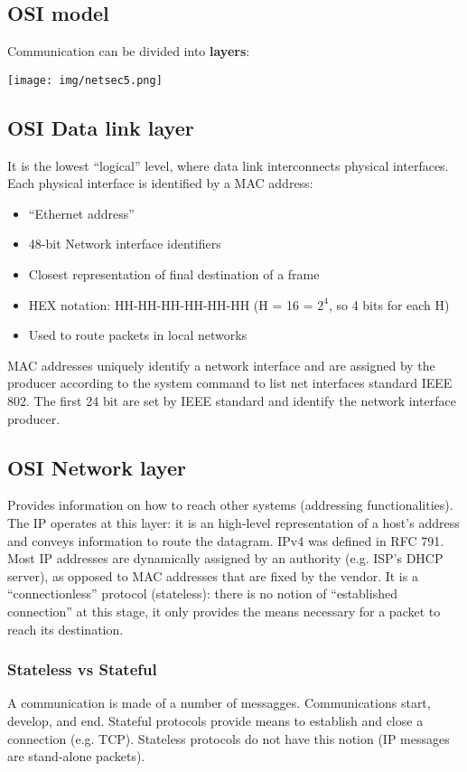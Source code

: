 \documentclass[a4paper, 10pt, titlepage]{article}
\begin{document}
\subsection*{OSI model}
Communication can be divided into \textbf{layers}:
\begin{center}
	\texttt{[image: img/netsec5.png]}
\end{center}

\subsection{OSI Data link layer}
It is the lowest “logical” level, where data link interconnects physical interfaces. Each physical interface is identified by a MAC address:
\begin{itemize}
\item “Ethernet address”
\item 48-bit Network interface identifiers
\item Closest representation of final destination of a frame
\item HEX notation: HH-HH-HH-HH-HH-HH (H = 16 = $2^4$, so 4 bits for each H)
\item Used to route packets in local networks
\end{itemize}
MAC addresses uniquely identify a network interface and are assigned by the producer according to the system command to list net interfaces standard IEEE 802. The first 24 bit are set by IEEE standard and identify the network interface producer.

\subsection{OSI Network layer}
Provides information on how to reach other systems (addressing functionalities). The IP operates at this layer: it is an high-level representation of a host’s address and conveys information to route the datagram. IPv4 was defined in RFC 791. Most IP addresses are dynamically assigned by an authority (e.g. ISP’s DHCP server), as opposed to MAC addresses that are fixed by the vendor. It is a “connectionless” protocol (stateless): there is no notion of “established connection” at this stage, it only provides the means necessary for a packet to reach its destination.

\subsubsection*{Stateless vs Stateful}
A communication is made of a number of messagges. Communications start, develop, and end. Stateful protocols provide means to establish and close a connection (e.g. TCP). Stateless protocols do not have this notion (IP messages are stand-alone packets).
\end{document}
